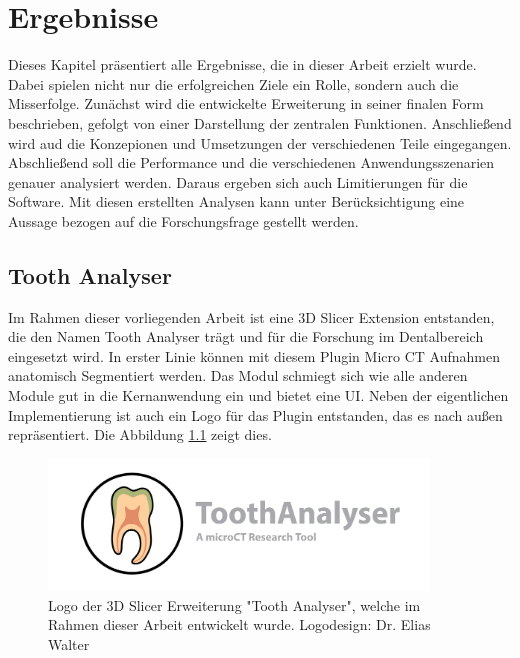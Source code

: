 \chapter{Ergebnisse}
\label{chap:ergebnisse} Dieses Kapitel präsentiert alle Ergebnisse, die in
dieser Arbeit erzielt wurde. Dabei spielen nicht nur die erfolgreichen Ziele ein
Rolle, sondern auch die Misserfolge. Zunächst wird die entwickelte Erweiterung in
seiner finalen Form beschrieben, gefolgt von einer Darstellung der zentralen
Funktionen. Anschließend wird aud die Konzepionen und Umsetzungen der verschiedenen
Teile eingegangen. Abschließend soll die Performance und die verschiedenen
Anwendungsszenarien genauer analysiert werden. Daraus ergeben sich auch Limitierungen
für die Software. Mit diesen erstellten Analysen kann unter Berücksichtigung
eine Aussage bezogen auf die Forschungsfrage gestellt werden.

\section{Tooth Analyser}
Im Rahmen dieser vorliegenden Arbeit ist eine 3D Slicer Extension entstanden, die
den Namen Tooth Analyser trägt und für die Forschung im Dentalbereich eingesetzt
wird. In erster Linie können mit diesem Plugin Micro CT Aufnahmen anatomisch
Segmentiert werden. Das Modul schmiegt sich wie alle anderen Module gut in die Kernanwendung
ein und bietet eine \ac{UI}. Neben der eigentlichen Implementierung ist auch ein
Logo für das Plugin entstanden, das es nach außen repräsentiert. Die Abbildung \ref{fig:logo_tooth_analyser}
zeigt dies.

\begin{figure}[h]
	\centering
	\includegraphics[width=0.9\textwidth]{img/SlicerToothAnalyser.png}
	\caption{Logo der 3D Slicer Erweiterung "Tooth Analyser", welche im Rahmen dieser
	Arbeit entwickelt wurde. Logodesign: Dr. Elias Walter}
	\label{fig:logo_tooth_analyser}
\end{figure}

